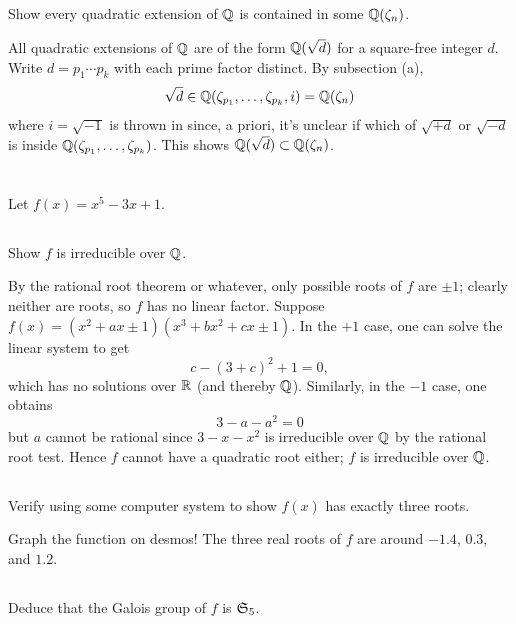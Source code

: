 \documentclass[12pt]{article}
\begin{document}
\subsection{}
Show every quadratic extension of $\mathbb{Q}$ is contained in some $\mathbb{Q}(\zeta_n)$. 

\noindent \dotfill 

All quadratic extensions of $\mathbb{Q}$ are of the form $\mathbb{Q}(\sqrt{d})$ for a square-free integer $d$. 
Write $d = p_1 \cdots p_k$ with each prime factor distinct. 
By subsection (a), 
$$\sqrt{d} \in \mathbb{Q}(\zeta_{p_1}, \ldots, \zeta_{p_k}, i) = \mathbb{Q}(\zeta_n)$$ 
where $i = \sqrt{-1}$ is thrown in since, a priori, it's unclear if which of $\sqrt{+d}$ or $\sqrt{-d}$ is inside $\mathbb{Q}(\zeta_{p_1}, \ldots, \zeta_{p_k})$. 
This shows $\mathbb{Q}(\sqrt{d}) \subset \mathbb{Q}(\zeta_n)$. 

\section{} 
Let $f(x) = x^5 - 3x + 1$. 
\subsection{}
Show $f$ is irreducible over $\mathbb{Q}$. 

\noindent \dotfill


By the rational root theorem or whatever, only possible roots of $f$ are $\pm 1$; 
clearly neither are roots, so $f$ has no linear factor. 
Suppose $f(x) = (x^2 + ax \pm 1)(x^3 + bx^2 + cx \pm 1)$. 
In the $+1$ case, one can solve the linear system to get 
$$c - (3 + c)^2 + 1 = 0,$$
which has no solutions over $\mathbb{R}$ (and thereby $\mathbb{Q}$). 
Similarly, in the $-1$ case, one obtains 
$$3 - a - a^2 = 0$$
but $a$ cannot be rational since $3 - x - x^2$ is irreducible over $\mathbb{Q}$ by the rational root test. 
Hence $f$ cannot have a quadratic root either; 
$f$ is irreducible over $\mathbb{Q}$. 

\subsection{} 
Verify using some computer system to show $f(x)$ has exactly three roots. 

\noindent \dotfill 

Graph the function on desmos! 
The three real roots of $f$ are around $-1.4$, $0.3$, and $1.2$. 

\subsection{} 
Deduce that the Galois group of $f$ is $\mathfrak{S}_{5}$. 
\end{document}

